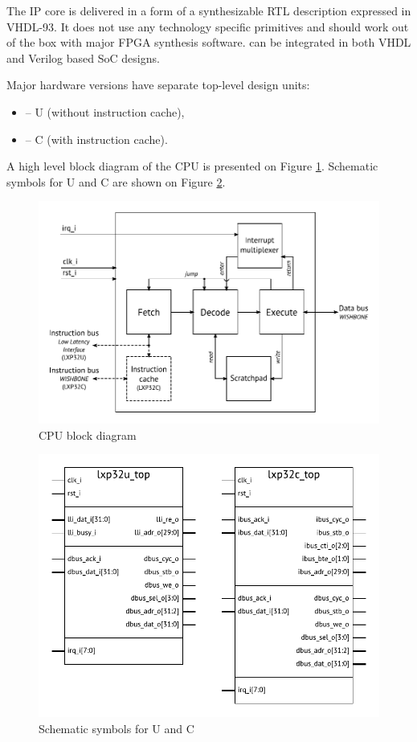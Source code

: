 \documentclass[a4paper,12pt,twoside,extrafontsizes]{memoir}
\begin{document}
The \lxp{} IP core is delivered in a form of a synthesizable RTL description expressed in \mbox{VHDL-93}. It does not use any technology specific primitives and should work out of the box with major FPGA synthesis software. \lxp{} can be integrated in both VHDL and Verilog\textregistered{} based SoC designs.

Major \lxp{} hardware versions have separate top-level design units:

\begin{itemize}
	\item {} -- \lxp{}U (without instruction cache),
	\item {} -- \lxp{}C (with instruction cache).
\end{itemize}

A high level block diagram of the CPU is presented on Figure \ref{fig:blockdiagram}. Schematic symbols for \lxp{}U and \lxp{}C are shown on Figure \ref{fig:symbols}.

\begin{figure}[htbp]
	\centering
	\includegraphics[scale=0.85]{images/blockdiagram.pdf}
	\caption{\lxp{} CPU block diagram}
	\label{fig:blockdiagram}
\end{figure}

\begin{figure}[htbp]
	\centering
	\includegraphics[scale=0.85]{images/symbols.pdf}
	\caption{Schematic symbols for \lxp{}U and \lxp{}C}
	\label{fig:symbols}
\end{figure}
\end{document}
